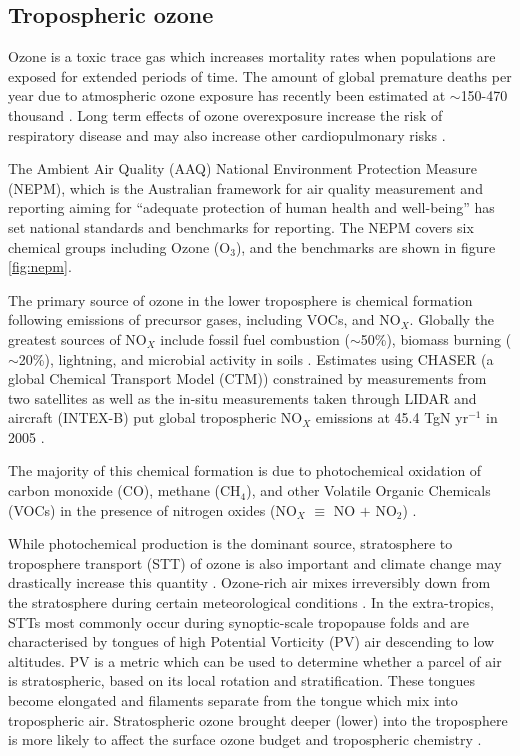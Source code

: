 \subsection{Tropospheric ozone}

Ozone is a toxic trace gas which increases mortality rates when populations are exposed for extended periods of time.
The amount of global premature deaths per year due to atmospheric ozone exposure has recently been estimated at $\sim$150-470 thousand \cite{Silva_2013, Lelieveld_2015}.
Long term effects of ozone overexposure increase the risk of respiratory disease and may also increase other cardiopulmonary risks \cite{Jerrett_2009}.

The Ambient Air Quality (AAQ) National Environment Protection Measure (NEPM), which is the Australian framework for air quality measurement and reporting aiming for ``adequate protection of human health and well-being'' has set national standards and benchmarks for reporting. The NEPM covers six chemical groups including Ozone (O$_3$), and the benchmarks are shown in figure \ref{fig:nepm}.

The primary source of ozone in the lower troposphere is chemical formation following emissions of precursor gases, including VOCs, and NO$_X$.
Globally the greatest sources of NO$_X$ include fossil fuel combustion ($\sim$50\%), biomass burning ($\sim$20\%), lightning, and microbial activity in soils \citep{Delmas_1997}.
Estimates using CHASER (a global Chemical Transport Model (CTM)) constrained by measurements from two satellites as well as the in-situ measurements taken through LIDAR and aircraft (INTEX-B) put global tropospheric NO$_X$ emissions at 45.4 TgN yr$^{-1}$ in 2005 \cite{Miyazaki_2011}.

The majority of this chemical formation is due to photochemical oxidation of carbon monoxide (CO), methane (CH$_4$), and other Volatile Organic Chemicals (VOCs) in the presence of nitrogen oxides (NO$_X$ $\equiv$ NO $+$ NO$_2$) \cite{Stevenson_2006}.

While photochemical production is the dominant source, stratosphere to troposphere transport (STT) of ozone is also important and climate change may drastically increase this quantity \cite{Hegglin_2009}.
Ozone-rich air mixes irreversibly down from the stratosphere during certain meteorological conditions \citep{Sprenger2003,Mihalikova2012}.
In the extra-tropics, STTs most commonly occur during synoptic-scale tropopause folds \citep{Sprenger2003} and are characterised by tongues of high Potential Vorticity (PV) air descending to low altitudes.
PV is a metric which can be used to determine whether a parcel of air is stratospheric, based on its local rotation and stratification.
These tongues become elongated and filaments separate from the tongue which mix into tropospheric air.
Stratospheric ozone brought deeper (lower) into the troposphere is more likely to affect the surface ozone budget and tropospheric chemistry \citep{Zanis2003,Langford_2009}.

